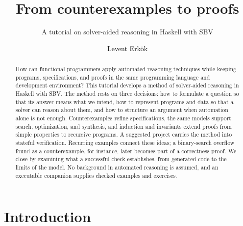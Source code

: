 \documentclass[review]{jfp-epi}
\title{From counterexamples to proofs}
\subtitle{A tutorial on solver-aided reasoning in Haskell with SBV}
\author{Levent Erkök}
\newcounter{exercise}
\begin{document}
\raggedbottom
\setlength{\emergencystretch}{2em}
\begin{abstract}
How can functional programmers apply automated reasoning techniques while keeping
programs, specifications, and proofs in the same programming language and
development environment? This tutorial develops a method of solver-aided reasoning
in Haskell with SBV. The method rests on three decisions: how to
formulate a question so that its answer means what we intend, how to represent
programs and data so that a solver can reason about them, and how to structure
an argument when automation alone is not enough. Counterexamples refine
specifications, the same models support search, optimization, and synthesis, and
induction and invariants extend proofs from simple properties to recursive
programs. A suggested project carries the method into stateful verification.
Recurring examples connect these ideas; a binary-search
overflow found as a counterexample, for instance, later becomes part of a
correctness proof. We close by examining what a successful check establishes,
from generated code to the limits of the model. No background in automated
reasoning is assumed, and an executable companion supplies checked examples and
exercises.
\end{abstract}

\maketitle

\setcounter{tocdepth}{2}
\begingroup
\fontsize{9}{10.5}\selectfont
\let\outlinecontentsline\contentsline
\renewcommand{\contentsline}[4]{%
  \ifstrequal{#2}{Abstract}{}{%
    \ifstrequal{#2}{Contents}{}{\outlinecontentsline{#1}{#2}{#3}{#4}}}}
\tableofcontents
\endgroup

\section{Introduction}
\label{sec:introduction}
\end{document}
